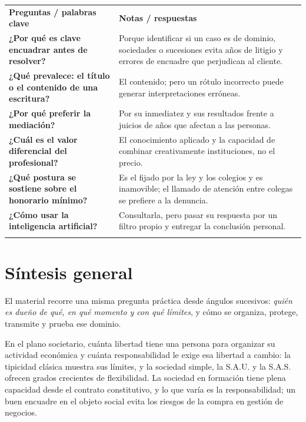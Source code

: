 \documentclass[12pt,oneside]{book}
\newcommand{\cq}[1]{\textbf{#1}}
\newcommand{\cornell}[3]{%
  \par\medskip\noindent\begingroup
  \renewcommand{\arraystretch}{1.25}%
  \begin{tabularx}{\textwidth}{|>{\raggedright\arraybackslash}p{0.27\textwidth}|>{\raggedright\arraybackslash}X|}
    \hline
    \multicolumn{2}{|>{\centering\arraybackslash}X|}{\cellcolor{azulacad!12}\textbf{Cuadro Cornell --- #1}}\\ \hline
    \cellcolor{gray!10}\textbf{Preguntas / palabras clave} & \cellcolor{gray!10}\textbf{Notas / respuestas} \\ \hline
    #2
    \multicolumn{2}{|>{\raggedright\arraybackslash}X|}{\cellcolor{azulacad!6}\textbf{Resumen.} #3}\\ \hline
  \end{tabularx}%
  \endgroup\par\medskip}
\begin{document}
\cornell{Ejercicio profesional}{
\cq{¿Por qué es clave encuadrar antes de resolver?} & Porque identificar si un caso es de dominio, sociedades o sucesiones evita años de litigio y errores de encuadre que perjudican al cliente. \\ \hline
\cq{¿Qué prevalece: el título o el contenido de una escritura?} & El contenido; pero un rótulo incorrecto puede generar interpretaciones erróneas. \\ \hline
\cq{¿Por qué preferir la mediación?} & Por su inmediatez y sus resultados frente a juicios de años que afectan a las personas. \\ \hline
\cq{¿Cuál es el valor diferencial del profesional?} & El conocimiento aplicado y la capacidad de combinar creativamente instituciones, no el precio. \\ \hline
\cq{¿Qué postura se sostiene sobre el honorario mínimo?} & Es el fijado por la ley y los colegios y es inamovible; el llamado de atención entre colegas se prefiere a la denuncia. \\ \hline
\cq{¿Cómo usar la inteligencia artificial?} & Consultarla, pero pasar su respuesta por un filtro propio y entregar la conclusión personal. \\ \hline
}{El ejercicio profesional se apoya en encuadrar bien, elegir la vía más eficiente (incluida la mediación), cobrar por conocimiento y no por precio, y formarse en tecnología para saber hacer las preguntas correctas.}

\chapter*{Síntesis general}

El material recorre una misma pregunta práctica desde ángulos sucesivos: \emph{quién es dueño de qué, en qué momento y con qué límites}, y cómo se organiza, protege, transmite y prueba ese dominio.

En el plano societario, cuánta libertad tiene una persona para organizar su actividad económica y cuánta responsabilidad le exige esa libertad a cambio: la tipicidad clásica muestra sus límites, y la sociedad simple, la S.A.U. y la S.A.S. ofrecen grados crecientes de flexibilidad. La sociedad en formación tiene plena capacidad desde el contrato constitutivo, y lo que varía es la responsabilidad; un buen encuadre en el objeto social evita los riesgos de la compra en gestión de negocios.
\end{document}
